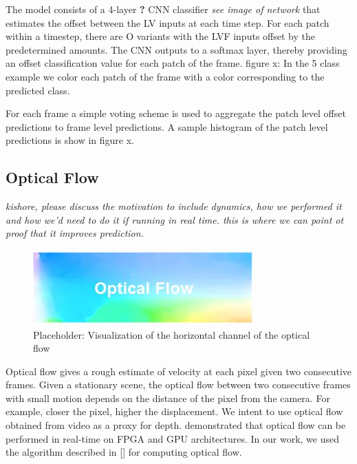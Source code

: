 \documentclass{article}
\begin{document}
The model consists of a 4-layer \textbf{?} CNN classifier \textit{see image of network} that estimates the offset between the LV inputs at each time step. For each patch within a timestep, there are O variants with the LVF inputs offset by the predetermined amounts. The CNN outputs to a softmax layer, thereby providing an offset classification value for each patch of the frame. 
figure x: In the 5 class example we color each patch of the frame with a color corresponding to the predicted class. 

For each frame a simple voting scheme is used to aggregate the patch level offset predictions to frame level predictions. A sample histogram of the patch level predictions is show in figure x.

\subsection{Optical Flow} %
\label{sub:optical_flow}
\textit{kishore, please discuss the motivation to include dynamics, how we performed it and how we'd need to do it if running in real time. this is where we can point ot proof that it improves prediction.}

\begin{figure}[htbp]
    \centering
        \includegraphics[scale=0.85]{Figures/OptFlow.jpg}
    \caption{Placeholder: Visualization of the horizontal channel of the optical flow}
    \label{fig:Figures_OptFlow placeholder}
\end{figure}

Optical flow gives a rough estimate of velocity at each pixel given two consecutive frames. Given a stationary scene, the optical flow between two consecutive frames with small motion depends on the distance of the pixel from the camera. For example, closer the pixel, higher the displacement. We intent to use optical flow obtained from video as a proxy for depth. \cite{Chase2008Real-Time-} demonstrated that optical flow can be performed in real-time on FPGA and GPU architectures. In our work, we used the algorithm described in [\cite{Liu2009Beyond-Pix}] for computing optical flow.
\end{document}
